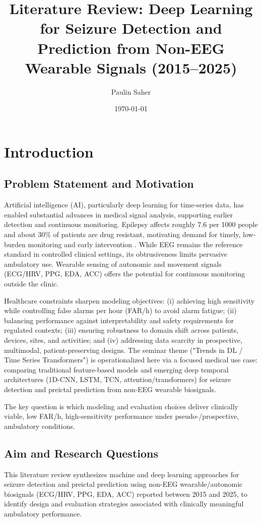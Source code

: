 \title{Literature Review: Deep Learning for Seizure Detection and Prediction
from Non-EEG Wearable Signals (2015--2025)}
\author{Paulin Saher}
\date{\today}
\maketitle

\section{Introduction}
\subsection{Problem Statement and Motivation}
Artificial intelligence (AI), particularly deep learning for time-series
data, has enabled substantial advances in medical signal analysis,
supporting earlier detection and continuous monitoring. Epilepsy affects
roughly 7.6 per 1000 people and about 30\% of patients are drug
resistant, motivating demand for timely, low-burden monitoring and early
intervention \parencite{beghiEpidemiologyEpilepsy2019,kwanEarlyIdentificationRefractory2000,chenNewEraPersonalised2020}.
While EEG remains the reference standard in controlled clinical settings,
its obtrusiveness limits pervasive ambulatory use. Wearable sensing of
autonomic and movement signals (ECG/HRV, PPG, EDA, ACC) offers the
potential for continuous monitoring outside the clinic.

Healthcare constraints sharpen modeling objectives: (i) achieving high
sensitivity while controlling false alarms per hour (FAR/h) to avoid
alarm fatigue; (ii) balancing performance against interpretability and
safety requirements for regulated contexts; (iii) ensuring robustness to
domain shift across patients, devices, sites, and activities; and (iv)
addressing data scarcity in prospective, multimodal, patient-preserving
designs. The seminar theme ("Trends in DL / Time Series
Transformers") is operationalized here via a focused medical use case:
comparing traditional feature-based models and emerging deep temporal
architectures (1D-CNN, LSTM, TCN, attention/transformers) for seizure
detection and preictal prediction from non-EEG wearable biosignals.

The key question is which modeling and evaluation choices deliver
clinically viable, low FAR/h, high-sensitivity performance under
pseudo-/prospective, ambulatory conditions.

\subsection{Aim and Research Questions}
This literature review synthesizes machine and deep learning approaches
for seizure detection and preictal prediction using non-EEG
wearable/autonomic biosignals (ECG/HRV, PPG, EDA, ACC) reported between
2015 and 2025, to identify design and evaluation strategies associated
with clinically meaningful ambulatory performance.

